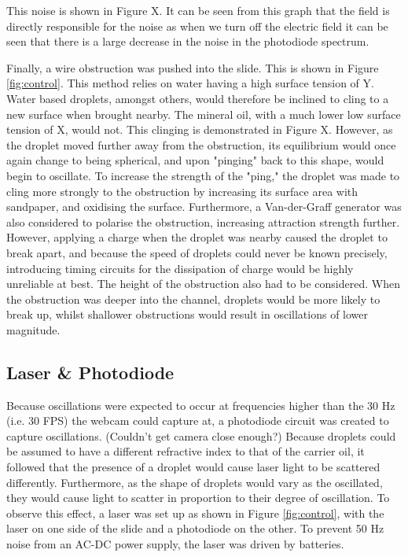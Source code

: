 \documentclass{physics_article_B}
\begin{document}
        This noise is shown in Figure X. It can be seen from this graph that the field is directly responsible for the noise as when we turn off the electric field it can be seen that there is a large decrease in the noise in the photodiode spectrum.
        
        Finally, a wire obstruction was pushed into the slide. This is shown in Figure \ref{fig:control}. This method relies on water having a high surface tension of Y. Water based droplets, amongst others, would therefore be inclined to cling to a new surface when brought nearby. The mineral oil, with a much lower low surface tension of X, would not. This clinging is demonstrated in Figure X. However, as the droplet moved further away from the obstruction, its equilibrium would once again change to being spherical, and upon "pinging" back to this shape, would begin to oscillate. To increase the strength of the "ping," the droplet was made to cling more strongly to the obstruction by increasing its surface area with sandpaper, and oxidising the surface. Furthermore, a Van-der-Graff generator was also considered to polarise the obstruction, increasing attraction strength further. However, applying a charge when the droplet was nearby caused the droplet to break apart, and because the speed of droplets could never be known precisely, introducing timing circuits for the dissipation of charge would be highly unreliable at best. The height of the obstruction also had to be considered. When the obstruction was deeper into the channel, droplets would be more likely to break up, whilst shallower obstructions would result in oscillations of lower magnitude.  
             
        
    \subsection{Laser \& Photodiode\label{sect:method:laser}}
    
        Because oscillations were expected to occur at frequencies higher than the 30 Hz (i.e. 30 FPS) the webcam could capture at, a photodiode circuit was created to capture oscillations. (Couldn't get camera close enough?) Because droplets could be assumed to have a different refractive index to that of the carrier oil\cite{viscosity1,viscosity2}, it followed that the presence of a droplet would cause laser light to be scattered differently. Furthermore, as the shape of droplets would vary as the oscillated, they would cause light to scatter in proportion to their degree of oscillation. To observe this effect, a laser was set up as shown in Figure \ref{fig:control}, with the laser on one side of the slide and a photodiode on the other. To prevent 50 Hz noise from an AC-DC power supply, the laser was driven by batteries.
        
\end{document}
